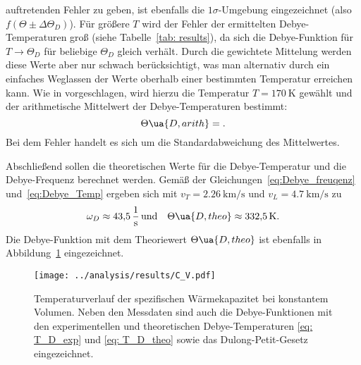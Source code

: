 auftretenden Fehler zu geben, ist ebenfalls die $1\sigma$-Umgebung eingezeichnet (also $f(\Theta \pm \Delta\Theta_D)$).
Für größere $T$ wird der Fehler der ermittelten Debye-Temperaturen groß (siehe Tabelle~\ref{tab: results}), da sich die Debye-Funktion für
$T \rightarrow \Theta_D$ für beliebige $\Theta_D$ gleich verhält. Durch die gewichtete Mittelung werden diese Werte aber nur schwach
berücksichtigt, was man alternativ durch ein einfaches Weglassen der Werte oberhalb einer bestimmten Temperatur erreichen kann.
Wie in \cite{anleitungV47} vorgeschlagen, wird hierzu die Temperatur $T = \SI{170}{\kelvin}$ gewählt und der arithmetische Mittelwert 
der Debye-Temperaturen bestimmt:
\begin{equation}
        \Theta\ua{D, arith} = .
        \label{eq: T_D_arith}
\end{equation}
Bei dem Fehler handelt es sich um die Standardabweichung des Mittelwertes. 

Abschließend sollen die theoretischen Werte für die Debye-Temperatur und die Debye-Frequenz berechnet werden.
Gemäß der Gleichungen~\eqref{eq:Debye_freuqenz} und~\eqref{eq:Debye_Temp} ergeben sich mit $v_T = \SI{2.26}{\kilo\meter\per\second}$
und $v_L = \SI{4.7}{\kilo\meter\per\second}$ zu
\begin{equation}
        \omega_D \approx \SI{43.5}{\per\second} \, \text{und} \quad \Theta\ua{D, theo} \approx \SI{332.5}{\kelvin}.
        \label{eq: T_D_theo}
\end{equation}
Die Debye-Funktion mit dem Theoriewert $\Theta\ua{D, theo}$ ist ebenfalls in Abbildung~\ref{fig: C_V} eingezeichnet.

\begin{figure}
\centering
\texttt{[image: ../analysis/results/C\_V.pdf]}
\caption{Temperaturverlauf der spezifischen Wärmekapazitet bei konstantem Volumen. Neben den Messdaten sind auch die
Debye-Funktionen mit den experimentellen und theoretischen Debye-Temperaturen \eqref{eq: T_D_exp} und \eqref{eq: T_D_theo} 
sowie das Dulong-Petit-Gesetz eingezeichnet.}
\label{fig: C_V}
\end{figure}


